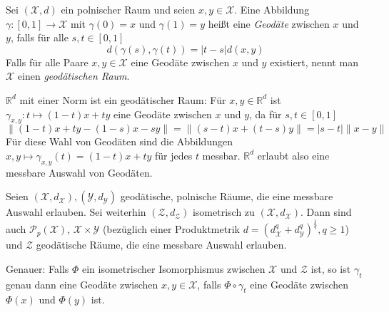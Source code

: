 \begin{definition}[Geodäte]
    Sei $(\mathcal{X},d)$ ein polnischer Raum und seien $x,y\in \mathcal{X}$. Eine Abbildung $\gamma:[0,1]\rightarrow \mathcal{X}$ mit $\gamma(0)=x$ und $\gamma(1)=y$ heißt eine \emph{Geodäte} zwischen $x$ und $y$, falls für alle $s,t \in [0,1]$
    $$d(\gamma(s), \gamma(t)) = |t-s| d(x,y)$$
    Falls für alle Paare $x,y \in \mathcal{X}$ eine Geodäte zwischen $x$ und $y$ existiert, nennt man $\mathcal{X}$ einen \emph{geodätischen Raum}.
\end{definition}
\begin{example}
$\mathbb{R}^d$ mit einer Norm ist ein geodätischer Raum: Für $x,y \in \mathbb{R}^d$ ist $\gamma_{x,y}: t \mapsto (1-t)x + ty$ eine Geodäte zwischen $x$ und $y$, da für $s,t \in [0,1]$
$$\|(1-t)x + ty - (1-s)x - sy \| = \|(s-t)x + (t-s)y\| = |s-t|\|x-y\|$$
Für diese Wahl von Geodäten sind die Abbildungen $x,y \mapsto \gamma_{x,y}(t)=(1-t)x+ty$ für jedes $t$ messbar. $\mathbb{R}^d$ erlaubt also eine messbare Auswahl von Geodäten.
\end{example}
\begin{lemma}
    Seien $(\mathcal{X}, d_{\mathcal{X}}), (\mathcal{Y}, d_{\mathcal{Y}})$ geodätische, polnische Räume, die eine messbare Auswahl erlauben. Sei weiterhin $(\mathcal{Z}, d_{\mathcal{Z}})$ isometrisch zu $(\mathcal{X}, d_{\mathcal{X}})$. Dann sind auch $\mathcal{P}_p(\mathcal{X})$, $\mathcal{X}\times \mathcal{Y}$ (bezüglich einer Produktmetrik $d = \left(d_\mathcal{X}^q+d_\mathcal{Y}^q\right)^\frac{1}{q}, q\geq 1$) und $\mathcal{Z}$ geodätische Räume, die eine messbare Auswahl erlauben.

    Genauer: Falls $\Phi$ ein isometrischer Isomorphismus zwischen $\mathcal{X}$ und $\mathcal{Z}$ ist, so ist $\gamma_t$ genau dann eine Geodäte zwischen $x,y \in \mathcal{X}$, falls $\Phi \circ \gamma_t$ eine Geodäte zwischen $\Phi(x)$ und $\Phi(y)$ ist.
\end{lemma}
